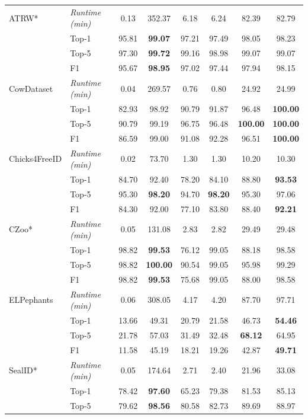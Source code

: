 \begin{longtable}{l l c c c c c c}
ATRW* & \textit{Runtime (min)} & 0.13 & 352.37 & 6.18 & 6.24 & 82.39 & 82.79 \\
 & Top-1 & 95.81 & \textbf{99.07} & 97.21 & 97.49 & 98.05 & 98.23 \\
 & Top-5 & 97.30 & \textbf{99.72} & 99.16 & 98.98 & 99.07 & 99.07 \\
 & F1 & 95.67 & \textbf{98.95} & 97.02 & 97.44 & 97.94 & 98.15 \\
\hline
CowDataset & \textit{Runtime (min)} & 0.04 & 269.57 & 0.76 & 0.80 & 24.92 & 24.99 \\
 & Top-1 & 82.93 & 98.92 & 90.79 & 91.87 & 96.48 & \textbf{100.00} \\
 & Top-5 & 90.79 & 99.19 & 96.75 & 96.48 & \textbf{100.00} & \textbf{100.00} \\
 & F1 & 86.59 & 99.00 & 91.08 & 92.28 & 96.51 & \textbf{100.00} \\
\hline
Chicks4FreeID & \textit{Runtime (min)} & 0.02 & 73.70 & 1.30 & 1.30 & 10.20 & 10.30 \\
 & Top-1 & 84.70 & 92.40 & 78.20 & 84.10 & 88.80 & \textbf{93.53} \\
 & Top-5 & 95.30 & \textbf{98.20} & 94.70 & \textbf{98.20} & 95.30 & 97.06 \\
 & F1 & 84.30 & 92.00 & 77.10 & 83.80 & 88.40 & \textbf{92.21} \\
\hline
CZoo* & \textit{Runtime (min)} & 0.05 & 131.08 & 2.83 & 2.82 & 29.49 & 29.48 \\
 & Top-1 & 98.82 & \textbf{99.53} & 76.12 & 99.05 & 88.18 & 98.58 \\
 & Top-5 & 98.82 & \textbf{100.00} & 90.54 & 99.05 & 95.98 & 99.29 \\
 & F1 & 98.82 & \textbf{99.53} & 75.68 & 99.05 & 88.00 & 98.58 \\
\hline
ELPephants & \textit{Runtime (min)} & 0.06 & 308.05 & 4.17 & 4.20 & 87.70 & 97.71 \\
 & Top-1 & 13.66 & 49.31 & 20.79 & 21.58 & 46.73 & \textbf{54.46} \\
 & Top-5 & 21.78 & 57.03 & 31.49 & 32.48 & \textbf{68.12} & 64.95 \\
 & F1 & 11.58 & 45.19 & 18.21 & 19.26 & 42.87 & \textbf{49.71} \\
\hline
SealID* & \textit{Runtime (min)} & 0.05 & 174.64 & 2.71 & 2.40 & 21.96 & 33.08 \\
 & Top-1 & 78.42 & \textbf{97.60} & 65.23 & 79.38 & 81.53 & 85.13 \\
 & Top-5 & 79.62 & \textbf{98.56} & 80.58 & 82.73 & 89.69 & 88.97 \\

\end{longtable}
